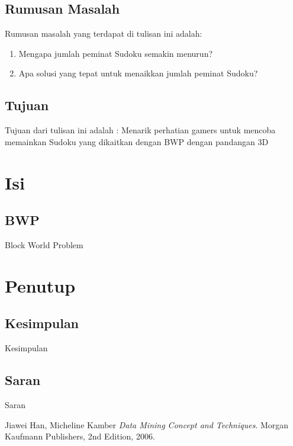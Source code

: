 \documentclass[11pt,a4paper]{report}
\begin{document}
\section{Rumusan Masalah}
Rumusan masalah yang terdapat di tulisan ini adalah:
\begin{enumerate}
	\item Mengapa jumlah peminat Sudoku semakin menurun?
	\item Apa solusi yang tepat untuk menaikkan jumlah peminat Sudoku?
\end{enumerate}

\section{Tujuan}
Tujuan dari tulisan ini adalah : Menarik perhatian gamers untuk mencoba memainkan Sudoku yang dikaitkan dengan BWP dengan pandangan 3D

\chapter{Isi} %
\section{BWP}
Block World Problem


\chapter{Penutup} %
\section{Kesimpulan}
Kesimpulan
\section{Saran}
Saran

\begin{thebibliography}{9}

  Jiawei Han, Micheline Kamber
  \emph{Data Mining Concept and Techniques}.
  Morgan Kaufmann Publishers,
  2nd Edition,
  2006.

\end{thebibliography}
\end{document}
